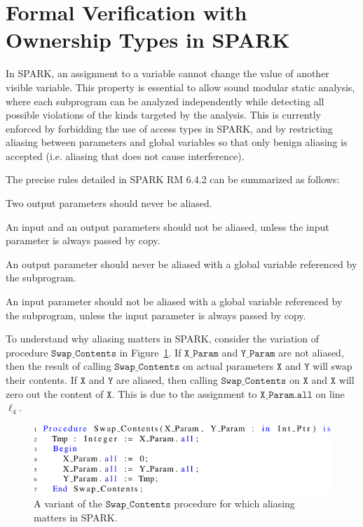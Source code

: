 \documentclass{llncs}
\newcommand\var[1]{\ensuremath{\mathtt{#1}}}
\begin{document}
\section{Formal Verification with Ownership Types in SPARK}

In SPARK, an assignment to a variable cannot change the value of another visible variable. This property is essential to allow sound modular static analysis,
where each subprogram can be analyzed independently while detecting all possible violations of the kinds targeted by the analysis.
This is currently enforced by forbidding the use of access types in SPARK, and by restricting aliasing between parameters and global variables so that only
benign aliasing is accepted (i.e. aliasing that does not cause interference).

The precise rules detailed in SPARK RM 6.4.2 can be summarized as follows:

\begin{compactitem}
  \item Two output parameters should never be aliased.
  \item An input and an output parameters should not be aliased, unless the input parameter is always passed by copy.
  \item An output parameter should never be aliased with a global variable referenced by the subprogram.
  \item An input parameter should not be aliased with a global variable referenced by the subprogram, unless the input parameter is always passed by copy.
\end{compactitem}

To understand why aliasing matters in SPARK, consider the variation of procedure \var{Swap\_Contents} in Figure~\ref{fig:spark_ex1}. If \var{X\_Param} and \var{Y\_Param}
are not aliased, then the result of calling \var{Swap\_Contents} on actual parameters \var{X} and \var{Y} will swap their contents. If \var{X} and \var{Y} are aliased, then calling
\var{Swap\_Contents} on \var{X} and \var{X} will zero out the content of \var{X}. This is due to the assignment to \var{X\_Param.all} on line $\ell_4$.


\begin{figure}[htb!]
\centering
  \captionsetup{justification=centering,margin=0.6cm}
   \includegraphics[]{spark_ex1}
   \caption{A variant of the \var{Swap\_Contents} procedure for which aliasing matters in SPARK.}
   \label{fig:spark_ex1}
\end{figure}
  
\end{document}
